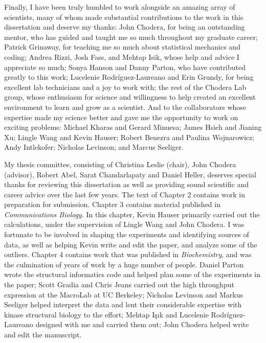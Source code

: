 \documentclass[phd,tocprelim]{cornell}
\begin{document}
\begin{acknowledgements}
Finally, I have been truly humbled to work alongside an amazing array of scientists, many of whom made substantial contributions to the work in this dissertation and deserve my thanks: John Chodera, for being an outstanding mentor, who has guided and taught me so much throughout my graduate career; Patrick Grinaway, for teaching me so much about statistical mechanics and coding; Andrea Rizzi, Josh Fass, and Mehtap Isik, whose help and advice I appreciate so much; Sonya Hanson and Danny Parton, who have contributed greatly to this work; Lucelenie Rodr\'{i}guez-Laureano and Erin Grundy, for being excellent lab technicians and a joy to work with; the rest of the Chodera Lab group, whose enthusiasm for science and willingness to help created an excellent environment to learn and grow as a scientist. And to the collaborators whose expertise made my science better and gave me the opportunity to work on exciting problems: Michael Kharas and Gerard Minuesa; James Hsieh and Jianing Xu; Lingle Wang and Kevin Hauser; Robert Benezra and Paulina Wojnarowicz; Andy Intlekofer; Nicholas Levinson; and Marcus Seeliger. 

My thesis committee, consisting of Christina Leslie (chair), John Chodera (advisor), Robert Abel, Sarat Chandarlapaty and Daniel Heller, deserves special thanks for reviewing this dissertation as well as providing sound scientific and career advice over the last few years. The text of Chapter 2 contains work in preparation for submission. Chapter 3 contains material published in \emph{Communications Biology}. In this chapter, Kevin Hauser primarily carried out the calculations, under the supervision of Lingle Wang and John Chodera. I was fortunate to be involved in shaping the experiments and identifying sources of data, as well as helping Kevin write and edit the paper, and analyze some of the outliers. Chapter 4 contains work that was published in \emph{Biochemistry}, and was the culmination of years of work by a huge number of people. Daniel Parton wrote the structural informatics code and helped plan some of the experiments in the paper; Scott Gradia and Chris Jeans carried out the high throughput expression at the MacroLab at UC Berkeley; Nicholas Levinson and Markus Seeliger helped interpret the data and lent their considerable expertise with kinase structural biology to the effort; Mehtap Işık and Lucelenie Rodr\'{i}guez-Laureano designed with me and carried them out; John Chodera helped write and edit the manuscript. 





\end{acknowledgements}
\end{document}
